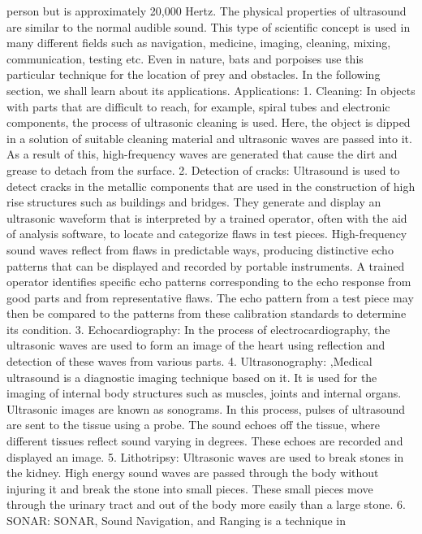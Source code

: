 person but is approximately 20,000 Hertz. The physical properties
of ultrasound are similar to the normal audible sound.
This type of scientific concept is used in many different fields such
as navigation, medicine, imaging, cleaning, mixing, communication,
testing etc. Even in nature, bats and porpoises use this particular
technique for the location of prey and obstacles. In the following
section, we shall learn about its applications.
Applications:
1. Cleaning: In objects with parts that are difficult to reach, for
example, spiral tubes and electronic components, the process of
ultrasonic cleaning is used. Here, the object is dipped in a solution of
suitable cleaning material and ultrasonic waves are passed into it. As
a result of this, high-frequency waves are generated that cause the
dirt and grease to detach from the surface.
2. Detection of cracks: Ultrasound is used to detect cracks in the
metallic components that are used in the construction of high rise
structures such as buildings and bridges. They generate and display
an ultrasonic waveform that is interpreted by a trained operator,
often with the aid of analysis software, to locate and categorize
flaws in test pieces. High-frequency sound waves reflect from flaws
in predictable ways, producing distinctive echo patterns that can be
displayed and recorded by portable instruments. A trained operator
identifies specific echo patterns corresponding to the echo response
from good parts and from representative flaws. The echo pattern
from a test piece may then be compared to the patterns from these
calibration standards to determine its condition.
3. Echocardiography: In the process of electrocardiography, the
ultrasonic waves are used to form an image of the heart using
reflection and detection of these waves from various parts.
4. Ultrasonography: ,Medical ultrasound is a diagnostic imaging
technique based on it. It is used for the imaging of internal body
structures such as muscles, joints and internal organs. Ultrasonic
images are known as sonograms. In this process, pulses of ultrasound
are sent to the tissue using a probe. The sound echoes off the
tissue, where different tissues reflect sound varying in degrees.
These echoes are recorded and displayed an image.
5. Lithotripsy: Ultrasonic waves are used to break stones in the
kidney. High energy sound waves are passed through the body
without injuring it and break the stone into small pieces. These small
pieces move through the urinary tract and out of the body more
easily than a large stone.
6. SONAR: SONAR, Sound Navigation, and Ranging is a technique in
